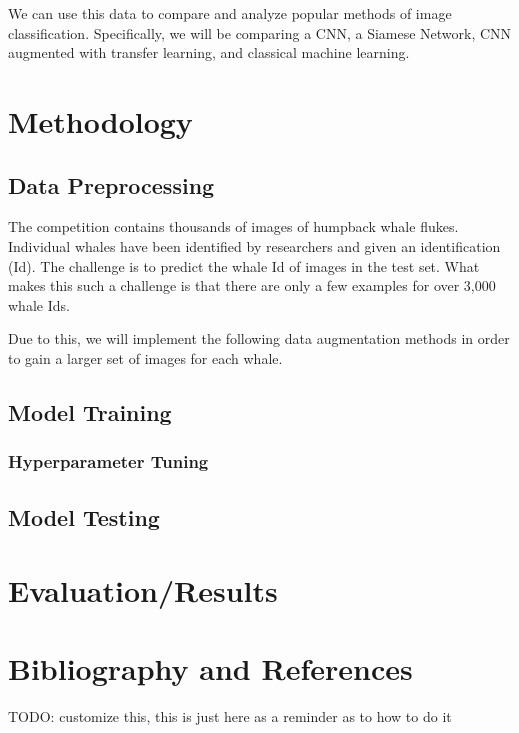 \documentclass[paper=a4, fontsize=11pt]{scrartcl}
\numberwithin{equation}{section}		%
\numberwithin{table}{section}				%
\begin{document}
We can use this data to compare and analyze popular methods of image classification. Specifically, we will be comparing a CNN, a Siamese Network, CNN augmented with transfer learning, and classical machine learning.

\section{Methodology}\label{sec: meth}

\subsection{Data Preprocessing}

The competition contains thousands of images of humpback whale flukes. Individual whales have been identified by researchers and given an identification (Id). The challenge is to predict the whale Id of images in the test set. What makes this such a challenge is that there are only a few examples for over 3,000 whale Ids.

Due to this, we will implement the following data augmentation methods in order to gain a larger set of images for each whale.

\subsection{Model Training}

\subsubsection{Hyperparameter Tuning}

\subsection{Model Testing}

\section{Evaluation/Results}\label{sec: results}

\section{Bibliography and References}\label{sec: bibliography}

TODO: customize this, this is just here as a reminder as to how to do it
\end{document}
